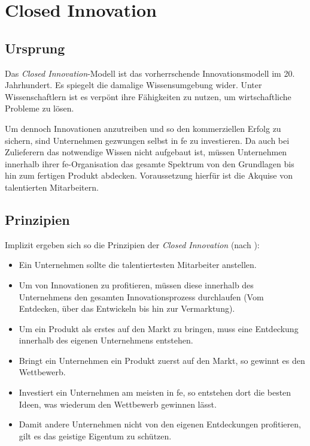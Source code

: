 \section{Closed Innovation}\label{sec:grundlagen-closed}

\subsection{Ursprung}
Das \textit{Closed Innovation}-Modell ist das vorherrschende Innovationsmodell im 20. Jahrhundert.
Es spiegelt die damalige Wissensumgebung wider.
Unter Wissenschaftlern ist es verpönt ihre Fähigkeiten zu nutzen, um wirtschaftliche Probleme zu lösen.

Um dennoch Innovationen anzutreiben und so den kommerziellen Erfolg zu sichern,
sind Unternehmen gezwungen selbst in \ac{fe} zu investieren.
Da auch bei Zulieferern das notwendige Wissen nicht aufgebaut ist,
müssen Unternehmen innerhalb ihrer \ac{fe}-Organisation das gesamte Spektrum von den Grundlagen bis hin zum fertigen Produkt abdecken.
Voraussetzung hierfür ist die Akquise von talentierten Mitarbeitern.

\subsection{Prinzipien}
Implizit ergeben sich so die Prinzipien der \textit{Closed Innovation} (nach \cite[19]{herzog2011}):
\begin{itemize}
    \item Ein Unternehmen sollte die talentiertesten Mitarbeiter anstellen.
    \item Um von Innovationen zu profitieren, müssen diese innerhalb des Unternehmens den gesamten Innovationsprozess durchlaufen (Vom Entdecken, über das Entwickeln bis hin zur Vermarktung).
    \item Um ein Produkt als erstes auf den Markt zu bringen, muss eine Entdeckung innerhalb des eigenen Unternehmens entstehen.
    \item Bringt ein Unternehmen ein Produkt zuerst auf den Markt, so gewinnt es den Wettbewerb.
    \item Investiert ein Unternehmen am meisten in \ac{fe}, so entstehen dort die besten Ideen, was wiederum den Wettbewerb gewinnen lässt.
    \item Damit andere Unternehmen nicht von den eigenen Entdeckungen profitieren, gilt es das geistige Eigentum zu schützen.
\end{itemize}

